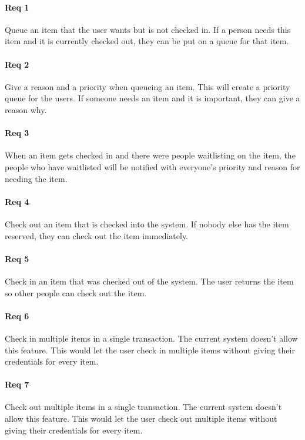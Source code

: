\documentclass[10pt, onecolumn, twoside, peerreview]{IEEEtran}
\begin{document}
\paragraph*{Req 1} Queue an item that the user wants but is not checked in. If a person needs this item and it is currently checked out,
they can be put on a queue for that item.\\

\paragraph*{Req 2} Give a reason and a priority when queueing an item. This will create a priority queue for the users. If someone needs
an item and it is important, they can give a reason why.\\

\paragraph*{Req 3} When an item gets checked in and there were people waitlisting on the item, the people who have waitlisted will be
notified with everyone's priority and reason for needing the item.\\

\paragraph*{Req 4} Check out an item that is checked into the system. If nobody else has the item reserved, they can check out the item
immediately.\\

\paragraph*{Req 5} Check in an item that was checked out of the system. The user returns the item so other people can check out the
item.\\

\paragraph*{Req 6} Check in multiple items in a single transaction. The current system doesn’t allow this feature. This would let the user
check in multiple items without giving their credentials for every item.\\

\paragraph*{Req 7} Check out multiple items in a single transaction. The current system doesn’t allow this feature. This would let the
user check out multiple items without giving their credentials for every item.\\
\end{document}
